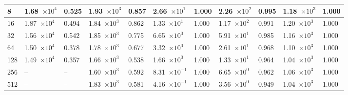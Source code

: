 \begin{table}[!t]
\begin{center}
\begin{small}
\begin{sc}
\begin{tabular}{|l|p{1.2cm}|p{0.8cm}|p{1.2cm}|p{0.8cm}|p{1.2cm}|p{0.8cm}|p{1.2cm}|p{0.8cm}|p{1.2cm}|p{0.8cm}|}
                    \hline
                    8   & 1.68~$\times10^{4}$ & 0.525 & 1.93~$\times10^{3}$ & 0.857 & 2.66~$\times10^{1}$  & 1.000 & 2.26~$\times10^{2}$ & 0.995  & 1.18~$\times10^{3}$ & 1.000 \\
                    \hline
                    16  & 1.87~$\times10^{4}$ & 0.494 & 1.84~$\times10^{3}$ & 0.862 & 1.33~$\times10^{1}$  & 1.000 & 1.17~$\times10^{2}$ & 0.991  & 1.20~$\times10^{3}$ & 1.000 \\
                    \hline
                    32  & 1.56~$\times10^{4}$ & 0.542 & 1.85~$\times10^{3}$ & 0.775 & 6.65~$\times10^{0}$  & 1.000 & 5.91~$\times10^{1}$ & 0.985  & 1.16~$\times10^{3}$ & 1.000 \\
                    \hline
                    64  & 1.50~$\times10^{4}$ & 0.378 & 1.78~$\times10^{3}$ & 0.677 & 3.32~$\times10^{0}$  & 1.000 & 2.61~$\times10^{1}$ & 0.968  & 1.10~$\times10^{3}$ & 1.000 \\
                    \hline
                    128 & 1.49~$\times10^{4}$ & 0.357 & 1.66~$\times10^{3}$ & 0.538 & 1.66~$\times10^{0}$  & 1.000 & 1.33~$\times10^{1}$ & 0.964  & 1.04~$\times10^{3}$ & 1.000 \\
                    \hline
                    256 & --                  & --    & 1.60~$\times10^{3}$ & 0.592 & 8.31~$\times10^{-1}$ & 1.000 & 6.65~$\times10^{0}$ & 0.962  & 1.06~$\times10^{3}$ & 1.000 \\
                    \hline
                    512 & --                  & --    & 1.83~$\times10^{3}$ & 0.581 & 4.16~$\times10^{-1}$ & 1.000 & 3.56~$\times10^{0}$ & 0.949  & 1.04~$\times10^{3}$ & 1.000 \\
                    \hline
                \end{tabular}
            \end{sc}
        \end{small}
    \end{center}
    \vskip -0.1in
\end{table}


